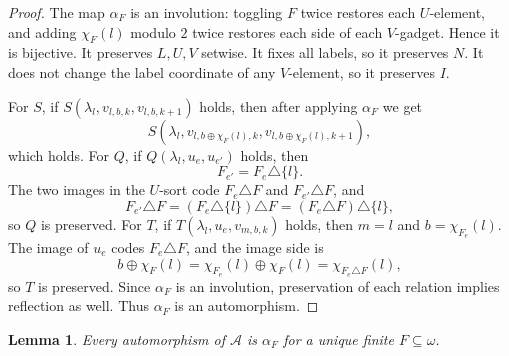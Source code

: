 \documentclass[12pt]{article}
\newtheorem{lemma}[theorem]{Lemma}
\theoremstyle{definition}
\theoremstyle{remark}
\begin{document}
\begin{proof}
The map \(\alpha_F\) is an involution: toggling \(F\) twice restores each \(U\)-element, and adding \(\chi_F(l)\) modulo \(2\) twice restores each side of each \(V\)-gadget.  Hence it is bijective.  It preserves \(L,U,V\) setwise.  It fixes all labels, so it preserves \(N\).  It does not change the label coordinate of any \(V\)-element, so it preserves \(I\).

For \(S\), if \(S(\lambda_l,v_{l,b,k},v_{l,b,k+1})\) holds, then after applying \(\alpha_F\) we get
\[
S(\lambda_l,v_{l,b\oplus\chi_F(l),k},v_{l,b\oplus\chi_F(l),k+1}),
\]
which holds.  For \(Q\), if \(Q(\lambda_l,u_e,u_{e'})\) holds, then
\[
F_{e'}=F_e\triangle\{l\}.
\]
The two images in the \(U\)-sort code \(F_e\triangle F\) and \(F_{e'}\triangle F\), and
\[
F_{e'}\triangle F=(F_e\triangle\{l\})\triangle F=(F_e\triangle F)\triangle\{l\},
\]
so \(Q\) is preserved.  For \(T\), if \(T(\lambda_l,u_e,v_{m,b,k})\) holds, then \(m=l\) and \(b=\chi_{F_e}(l)\).  The image of \(u_e\) codes \(F_e\triangle F\), and the image side is
\[
b\oplus\chi_F(l)=\chi_{F_e}(l)\oplus\chi_F(l)=\chi_{F_e\triangle F}(l),
\]
so \(T\) is preserved.  Since \(\alpha_F\) is an involution, preservation of each relation implies reflection as well.  Thus \(\alpha_F\) is an automorphism.
\end{proof}

\begin{lemma}\label{lem:all-aut}
Every automorphism of \(\mathcal A\) is \(\alpha_F\) for a unique finite \(F\subseteq\omega\).
\end{lemma}
\end{document}
